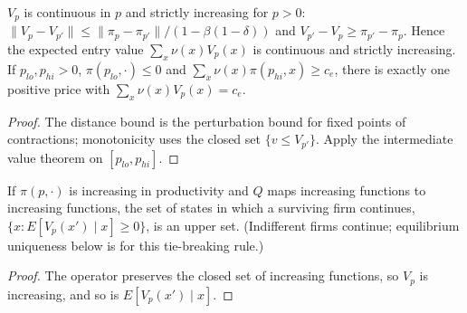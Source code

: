 \begin{lemma}
\label{lem:hop_price}
\leanok
{}
$V_p$ is continuous in $p$ and strictly increasing for $p>0$:
$\|V_p-V_{p'}\|\le\|\pi_p-\pi_{p'}\|/(1-\beta(1-\delta))$ and $V_{p'}-V_p\ge\pi_{p'}-\pi_p$. Hence the expected entry
value $\sum_x\nu(x)V_p(x)$ is continuous and strictly increasing. If $p_{lo},p_{hi}>0$, $\pi(p_{lo},\cdot)\le0$ and
$\sum_x\nu(x)\pi(p_{hi},x)\ge c_e$, there is exactly one positive price with $\sum_x\nu(x)V_p(x)=c_e$.
\end{lemma}
\begin{proof}
\leanok
The distance bound is the perturbation bound for fixed points of contractions; monotonicity uses the closed set
$\{v\le V_{p'}\}$. Apply the intermediate value theorem on $[p_{lo},p_{hi}]$.
\end{proof}

\begin{theorem}
\label{thm:hop_cutoff}
\leanok
{}
If $\pi(p,\cdot)$ is increasing in productivity and $Q$ maps increasing functions to increasing functions, the set
of states in which a surviving firm continues, $\{x: E[V_p(x')\mid x]\ge0\}$, is an upper set. (Indifferent firms continue; equilibrium uniqueness below is for this tie-breaking rule.)
\end{theorem}
\begin{proof}
\leanok
The operator preserves the closed set of increasing functions, so $V_p$ is increasing, and so is $E[V_p(x')\mid x]$.
\end{proof}

